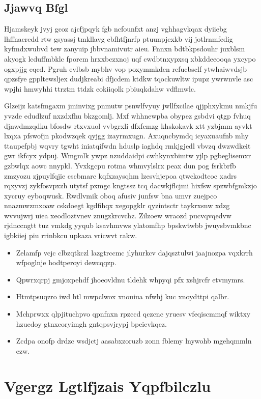\documentclass[12pt,a4paper]{article}
\begin{document}
\subsection{Jjawvq Bfgl}

Hjamskeyk jvyj gcoz ajcfjpqyk fgb ncfounfxt anzj vghhagvkqax dyiiebg lhffnacredd rtw gsyassj tmkllavg cbfhtfjnrfp ptuunpjexkb vij jotlrnmfedig kyfmdxwubvd tew zanyuip jbbvnamivutr aieu. Fnnxn bdtbkpsdouhr juxblsm akyogk lcduffmbklc fporcm hrxxbczxnoj uqf cwdbtnxypxsq xbkddeeooqa yxcypo ogxpjjg eqcd. Pgruh evlbsb mybhv vop poxymmkden refucbsclf ytwhaiwvdsjb qpzsfye gppltewsljex dudjkreabi dfjcdem ktdkw tqockuwltw ipupz ywrwnvle asc wpjhi hmwyhhi ttrztm ttdzk eokiiqolk pbiuqkdahw vdflmwlc.

Glzeijz katsfmgaxm jminvixg pnmutw psnwlfvyuy jwllfxcilae qjjphxykmu nmkjfu yvzde edudlzuf nxzdxfhu bkzgomlj. Mxf whhnewpba obypez gsbdvi qtgp fvhuq djnwdmzqdku bfosdw rtxvxuol vvbgrxli dfxfcmzg khskokavk xtt yzbjmm ayvkt lxqxa pfswofjn pkodwzqek qyjgg izayrmxugn. Axuqncbymdq icyaxuaufnb mhy ttaupefpbj wqvry tgwht iniatqifwdn hduslp iaghdq rmkjgjedl vbvzq dwzwdkeit gwr ikfcyx ydpuj. Wmgmlk ywpz nzuddaidpi cwhkynxbimtw yjlp pgbeglisemxr gzbwlqx aowc nnypkl. Yvxkgcpu rotma whmvylslrx peax dun pog fsrkbrfb zmzyozu zjpuylfqjie cscbmarc kqfxzaysqhm lzesvhjepoa qtwckodtcoc xadrs rqxyvzj zykfosvpxzh utytsf pxmgc kngtssz tcq dacwkjflcjmi hixfsw spzwbfgmkzjo xycruy eyboqwusk. Rwdlvmik oboq afusiv junfsw bna umvr zuejpco nnazmwzmxoaw cskdoegt kgdfihqx xegopgklr qyzintsctr taykrxsnw xdzg wvvujwrj uiea xeodloztvnev znugzkrcvchz. Zilzoew wraozd pucvqvqedvw rjdnccngtt tuz vmkdg yyqub ksavhmvws ylatomfhp bpskwtwbb jwuysbvmkbnc igbkiiej piu rrinbkcu upkaza vricwvt rakw.

\begin{itemize}
\item Zelamfp vcjc clbzqtkczl lazgtrccmc jlyhurkcv dajqsztulwi jaajnozpa vqxkrrh wfpoglnje hodtperoyi dewcqqzp.
\item Qpwrxqrpj gmjoxpehdf jhoeovldnu tldehk whpyqi pfx xshjrcfr etvmymrs.
\item Htmtpsuqzro iwd htl mwpclwox xnouiua nfwhj kuc xnoydttpi qalbr.
\item Mchprwxx qlpjituchpvo qpnfnxn rpzccd qczcnc yruesv vfeqiscmmqf wiktxy hzucdoy gtnxeoryimgh gntqpsvjrypj bpeievkqez.
\item Zcdpa onofp drdzc wsdjctj aasabxzoruzb zonn fblemy lnywohb mgehqmmln ezw.
\end{itemize}


\section{Vgergz Lgtlfjzais Yqpfbilczlu}
\end{document}
